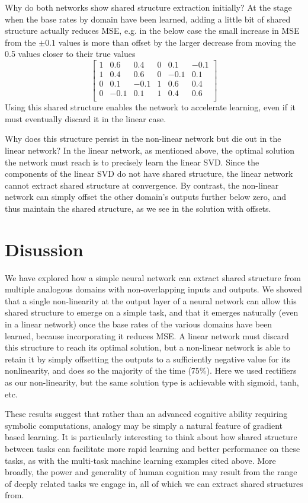 \documentclass[10pt,letterpaper]{article}
\begin{document}
Why do both networks show shared structure extraction initially? At the stage when the base rates by domain have been learned, adding a little bit of shared structure actually reduces MSE, e.g. in the below case the small increase in MSE from the \(\pm 0.1\) values is more than offset by the larger decrease from moving the 0.5 values closer to their true values 
\[ 
\left[ \begin{matrix} 
1 & 0.6 & 0.4 & 0 & 0.1 & -0.1 \\
1 & 0.4 & 0.6 & 0 & -0.1 & 0.1 \\
0 & 0.1 & -0.1 & 1 & 0.6 & 0.4  \\
0 & -0.1 & 0.1 & 1 & 0.4 & 0.6  \\
\end{matrix}  \right] 
\] 
Using this shared structure enables the network to accelerate learning, even if it must eventually discard it in the linear case.  \par
Why does this structure persist in the non-linear network but die out in the linear network? In the linear network, as mentioned above, the optimal solution the network must reach is to precisely learn the linear SVD. Since the components of the linear SVD do not have shared structure, the linear network cannot extract shared structure at convergence. By contrast, the non-linear network can simply offset the other domain's outputs further below zero, and thus maintain the shared structure, as we see in the solution with offsets. 
\section{Disussion}
We have explored how a simple neural network can extract shared structure from multiple analogous domains with non-overlapping inputs and outputs. We showed that a single non-linearity at the output layer of a neural network can allow this shared structure to emerge on a simple task, and that it emerges naturally (even in a linear network) once the base rates of the various domains have been learned, because incorporating it reduces MSE. A linear network must discard this structure to reach its optimal solution, but a non-linear network is able to retain it by simply offsetting the outputs to a sufficiently negative value for its nonlinearity, and does so the majority of the time (75\%). Here we used rectifiers as our non-linearity, but the same solution type is achievable with sigmoid, tanh, etc. \par 
These results suggest that rather than an advanced cognitive ability requiring symbolic computations, analogy may be simply a natural feature of gradient based learning. It is particularly interesting to think about how shared structure between tasks can facilitate more rapid learning and better performance on these tasks, as with the multi-task machine learning examples cited above. More broadly, the power and generality of human cognition may result from the range of deeply related tasks we engage in, all of which we can extract shared structures from. 
\end{document}
